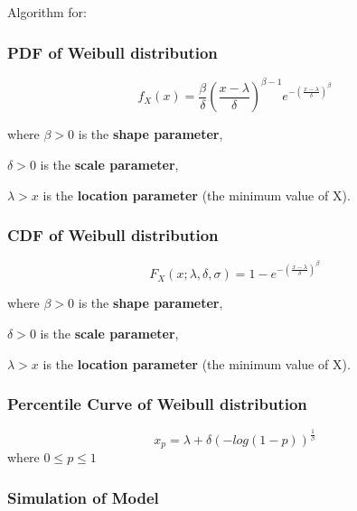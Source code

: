 \documentclass[11pt]{article}
\begin{document}
Algorithm for:

\hypertarget{pdf-of-weibull-distribution}{%
\subsubsection{PDF of Weibull
distribution}\label{pdf-of-weibull-distribution}}

\[
f_X(x) = 
\frac{\beta}{\delta}(\frac{x-\lambda}{\delta})^{\beta-1}e^{-(\frac{x-\lambda}{\delta})^\beta}
\]

where \(\beta > 0\) is the \textbf{shape parameter},

\(\delta > 0\) is the \textbf{scale parameter},

\(\lambda > x\) is the \textbf{location parameter} (the minimum value of
X).

\hypertarget{cdf-of-weibull-distribution}{%
\subsubsection{CDF of Weibull
distribution}\label{cdf-of-weibull-distribution}}

\[
F_X(x;\lambda,\delta,\sigma) = 1-e^{-({\frac{x-\lambda}{\delta}})^\beta}
\]

where \(\beta > 0\) is the \textbf{shape parameter},

\(\delta > 0\) is the \textbf{scale parameter},

\(\lambda > x\) is the \textbf{location parameter} (the minimum value of
X).

\hypertarget{percentile-curve-of-weibull-distribution}{%
\subsubsection{Percentile Curve of Weibull
distribution}\label{percentile-curve-of-weibull-distribution}}

\[
x_p = \lambda + \delta(-log(1-p))^{\frac{1}{\beta}}
\] where \(0\leq p\leq 1\)

\hypertarget{simulation-of-model}{%
\subsubsection{Simulation of Model}\label{simulation-of-model}}
\end{document}
